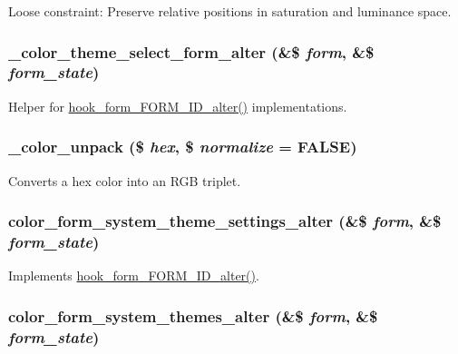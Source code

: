 Loose constraint: Preserve relative positions in saturation and luminance space. \hypertarget{color_8module_a023d4b5a0bdf2fcb2527d6d7289d55a5}{
\subsubsection[{\_\-color\_\-theme\_\-select\_\-form\_\-alter}]{\setlength{\rightskip}{0pt plus 5cm}\_\-color\_\-theme\_\-select\_\-form\_\-alter (\&\$ {\em form}, \/  \&\$ {\em form\_\-state})}}
\label{color_8module_a023d4b5a0bdf2fcb2527d6d7289d55a5}
Helper for \hyperlink{group__hooks_ga8d4a4089551493d55911bd5c4f218264}{hook\_\-form\_\-FORM\_\-ID\_\-alter()} implementations. \hypertarget{color_8module_aa8b05ebeece6ab52b7d5b7f8b39637e8}{
\subsubsection[{\_\-color\_\-unpack}]{\setlength{\rightskip}{0pt plus 5cm}\_\-color\_\-unpack (\$ {\em hex}, \/  \$ {\em normalize} = {\ttfamily FALSE})}}
\label{color_8module_aa8b05ebeece6ab52b7d5b7f8b39637e8}
Converts a hex color into an RGB triplet. \hypertarget{color_8module_ab6f3bf4ea432ab3752304d8a3ce8355f}{
\subsubsection[{color\_\-form\_\-system\_\-theme\_\-settings\_\-alter}]{\setlength{\rightskip}{0pt plus 5cm}color\_\-form\_\-system\_\-theme\_\-settings\_\-alter (\&\$ {\em form}, \/  \&\$ {\em form\_\-state})}}
\label{color_8module_ab6f3bf4ea432ab3752304d8a3ce8355f}
Implements \hyperlink{group__hooks_ga8d4a4089551493d55911bd5c4f218264}{hook\_\-form\_\-FORM\_\-ID\_\-alter()}. \hypertarget{color_8module_aab51ce0c8130ac6b9a89cf081321ba8a}{
\subsubsection[{color\_\-form\_\-system\_\-themes\_\-alter}]{\setlength{\rightskip}{0pt plus 5cm}color\_\-form\_\-system\_\-themes\_\-alter (\&\$ {\em form}, \/  \&\$ {\em form\_\-state})}}

